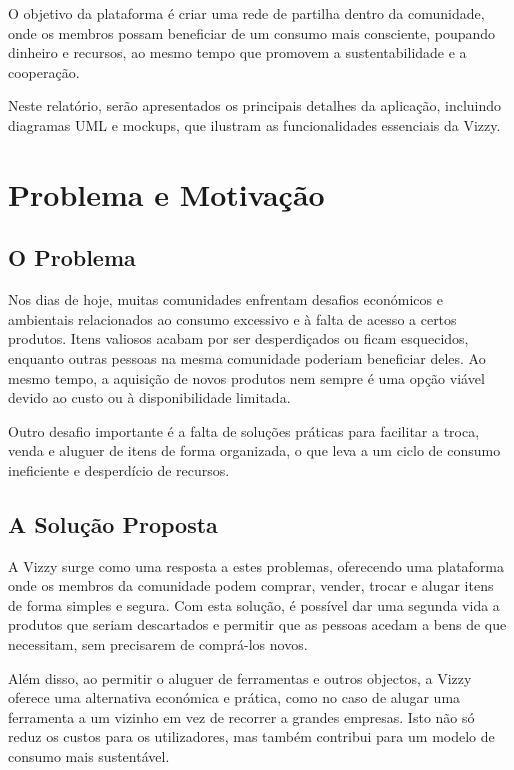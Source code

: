 \documentclass[a4paper, 12pt]{article} %
\begin{document}
O objetivo da plataforma é criar uma rede de partilha dentro da comunidade, onde os membros possam beneficiar de um consumo mais consciente, poupando dinheiro e recursos, ao mesmo tempo que promovem a sustentabilidade e a cooperação.

Neste relatório, serão apresentados os principais detalhes da aplicação, incluindo diagramas UML e mockups, que ilustram as funcionalidades essenciais da Vizzy.

\newpage
\section{Problema e Motivação}

\subsection{O Problema}

Nos dias de hoje, muitas comunidades enfrentam desafios económicos e ambientais relacionados ao consumo excessivo e à falta de acesso a certos produtos. Itens valiosos acabam por ser desperdiçados ou ficam esquecidos, enquanto outras pessoas na mesma comunidade poderiam beneficiar deles. Ao mesmo tempo, a aquisição de novos produtos nem sempre é uma opção viável devido ao custo ou à disponibilidade limitada.

Outro desafio importante é a falta de soluções práticas para facilitar a troca, venda e aluguer de itens de forma organizada, o que leva a um ciclo de consumo ineficiente e desperdício de recursos.

\subsection{A Solução Proposta}

A Vizzy surge como uma resposta a estes problemas, oferecendo uma plataforma onde os membros da comunidade podem comprar, vender, trocar e alugar itens de forma simples e segura. Com esta solução, é possível dar uma segunda vida a produtos que seriam descartados e permitir que as pessoas acedam a bens de que necessitam, sem precisarem de comprá-los novos.

Além disso, ao permitir o aluguer de ferramentas e outros objectos, a Vizzy oferece uma alternativa económica e prática, como no caso de alugar uma ferramenta a um vizinho em vez de recorrer a grandes empresas. Isto não só reduz os custos para os utilizadores, mas também contribui para um modelo de consumo mais sustentável.
\end{document}
